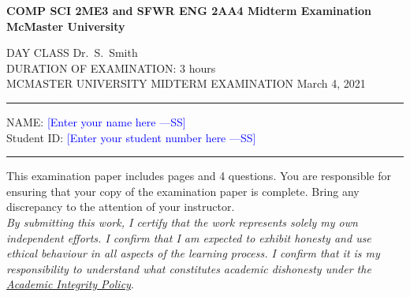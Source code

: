 \documentclass[12pt,fleqn]{examtst}
\newcommand{\authornote}[3]{\textcolor{#1}{[#3 ---#2]}}
\newcommand{\authornote}[3]{}
\newcommand{\wss}[1]{\authornote{blue}{SS}{#1}}
\begin{document}
\newcommand{\soln}{n} %

\lstset{language=python, basicstyle=\ttfamily, breaklines=true,
  showspaces=false, showstringspaces=false, breakatwhitespace=true}

\newcommand{\codeit}[1]{\texttt{\textit{#1}}}

\begin{center}
  {\large \bf COMP SCI 2ME3 and SFWR ENG 2AA4 Midterm Examination}\\[1ex]
  {\large \bf McMaster University}\\[1ex]
  \ifthenelse{\equal{\soln}{y}}{\large {\bf ANSWER KEY} %
  }{}
\end{center}

\medskip

\noindent
DAY CLASS%
\hfill Dr.~S.~Smith \\
DURATION OF EXAMINATION: 3 hours \\
MCMASTER UNIVERSITY MIDTERM EXAMINATION \hfill March 4, 2021

\medskip

\noindent
\rule[3 mm]{\textwidth}{0.5mm}


NAME: \wss{Enter your name here}\\[1ex]

Student ID: \wss{Enter your student number here} \\[2mm]

\noindent
\rule[3 mm]{\textwidth}{0.5mm}

This examination paper includes \noofpages pages and
4 %
questions. You are responsible for ensuring that your copy of the examination
paper is complete. Bring any discrepancy to the attention
of your instructor.\\

\noindent
\emph{By submitting this work, I certify that the work represents solely my own
independent efforts. I confirm that I am expected to exhibit honesty and use
ethical behaviour in all aspects of the learning process.  I confirm that it is
my responsibility to understand what constitutes academic dishonesty under the
\href{https://secretariat.mcmaster.ca/app/uploads/Academic-Integrity-Policy-1-1.pdf}
{Academic Integrity Policy}}.\\
\end{document}

